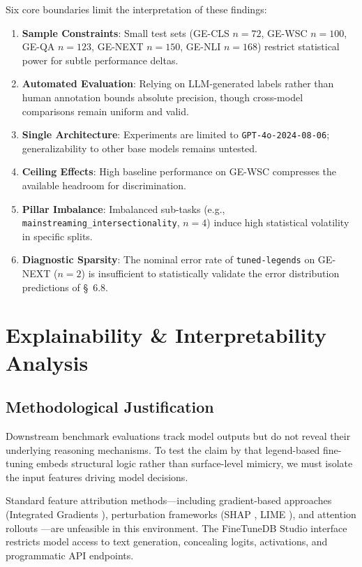 \documentclass[pdflatex,sn-mathphys-num]{sn-jnl}%
\theoremstyle{thmstyleone}%
\theoremstyle{thmstyletwo}%
\theoremstyle{thmstylethree}%
\begin{document}
Six core boundaries limit the interpretation of these findings:
\begin{enumerate}
    \item \textbf{Sample Constraints}: Small test sets (GE-CLS $n=72$, GE-WSC
    $n=100$, GE-QA $n=123$, GE-NEXT $n=150$, GE-NLI $n=168$) restrict
    statistical power for subtle performance deltas.
    \item \textbf{Automated Evaluation}: Relying on LLM-generated labels rather
    than human annotation bounds absolute precision, though cross-model
    comparisons remain uniform and valid.
    \item \textbf{Single Architecture}: Experiments are limited to
    \texttt{GPT-4o-2024-08-06}; generalizability to other base models remains
    untested.
    \item \textbf{Ceiling Effects}: High baseline performance on GE-WSC
    compresses the available headroom for discrimination.
    \item \textbf{Pillar Imbalance}: Imbalanced sub-tasks (e.g.,
    \texttt{mainstreaming\_intersectionality}, $n=4$) induce high statistical
    volatility in specific splits.
    \item \textbf{Diagnostic Sparsity}: The nominal error rate of
    \texttt{tuned-legends} on GE-NEXT ($n=2$) is insufficient to statistically
    validate the error distribution predictions of \S~6.8.
\end{enumerate}



\section{Explainability \& Interpretability Analysis}

\subsection{Methodological Justification}

Downstream benchmark evaluations track model outputs but do not reveal their
underlying reasoning mechanisms. To test the claim by
\citet{sargsyan2025compliance} that legend-based fine-tuning embeds structural
logic rather than surface-level mimicry, we must isolate the input features
driving model decisions. 

Standard feature attribution methods—including gradient-based approaches
(Integrated Gradients \citep{sundararajan2017axiomatic}), perturbation
frameworks (SHAP \citep{lundberg2017unified}, LIME \citep{ribeiro2016why}), and
attention rollouts \citep{abnar2020quantifying}—are unfeasible in this
environment. The FineTuneDB Studio interface restricts model access to text
generation, concealing logits, activations, and programmatic API endpoints. 
\end{document}
